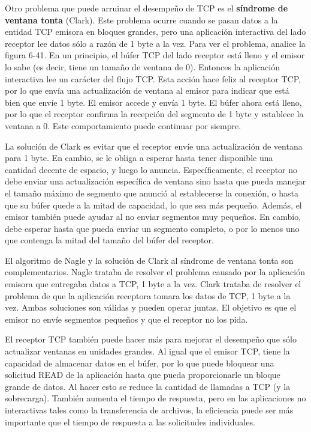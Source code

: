 \documentclass[10pt,a4paper]{report}
\begin{document}
	\par Otro problema que puede arruinar el desempeño de TCP es el \textbf{síndrome de ventana tonta} (Clark). Este problema ocurre cuando se pasan datos a la entidad TCP emisora en bloques grandes, pero una aplicación interactiva del lado receptor lee datos sólo a razón de 1 byte a la vez. Para ver el problema, analice la figura 6-41. En un principio, el búfer TCP del lado receptor está lleno y el emisor lo sabe (es decir, tiene un tamaño de ventana de 0). Entonces la aplicación interactiva lee un carácter del flujo TCP. Esta acción hace feliz al receptor TCP, por lo que envía una actualización de ventana al emisor para indicar que está bien que envíe 1 byte. El emisor accede y envía 1 byte. El búfer ahora está lleno, por lo que el receptor confirma la recepción del segmento de 1 byte y establece la ventana a 0. Este comportamiento puede continuar por siempre.

	\par La solución de Clark es evitar que el receptor envíe una actualización de ventana para 1 byte. En cambio, se le obliga a esperar hasta tener disponible una cantidad decente de espacio, y luego lo anuncia. Específicamente, el receptor no debe enviar una actualización específica de ventana sino hasta que pueda manejar el tamaño máximo de segmento que anunció al establecerse la conexión, o hasta que su búfer quede a la mitad de capacidad, lo que sea más pequeño. Además, el emisor también puede ayudar al no enviar segmentos muy pequeños. En cambio, debe esperar hasta que pueda enviar un segmento completo, o por lo menos uno que contenga la mitad del tamaño del búfer del receptor.

	\par El algoritmo de Nagle y la solución de Clark al síndrome de ventana tonta son complementarios. Nagle trataba de resolver el problema causado por la aplicación emisora que entregaba datos a TCP, 1 byte a la vez. Clark trataba de resolver el problema de que la aplicación receptora tomara los datos de TCP, 1 byte a la vez. Ambas soluciones son válidas y pueden operar juntas. El objetivo es que el emisor no envíe segmentos pequeños y que el receptor no los pida.

	\par El receptor TCP también puede hacer más para mejorar el desempeño que sólo actualizar ventanas en unidades grandes. Al igual que el emisor TCP, tiene la capacidad de almacenar datos en el búfer, por lo que puede bloquear una solicitud READ de la aplicación hasta que pueda proporcionarle un bloque grande de datos. Al hacer esto se reduce la cantidad de llamadas a TCP (y la sobrecarga). También aumenta el tiempo de respuesta, pero en las aplicaciones no interactivas tales como la transferencia de archivos, la eficiencia puede ser más importante que el tiempo de respuesta a las solicitudes individuales.
\end{document}
